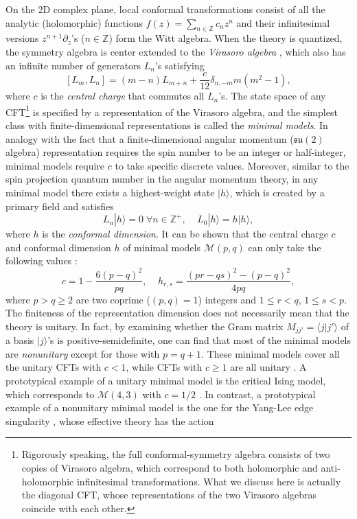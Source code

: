 \documentclass{tADP2e}
\theoremstyle{plain}
\theoremstyle{plain}
\theoremstyle{definition}
\begin{document}
\vspace{3pt}
\noindent
On the 2D complex plane, local conformal transformations consist of all the analytic (holomorphic) functions $f(z)=\sum_{n\in\mathbb{Z}}c_nz^n$ and their infinitesimal versions $z^{n+1}\partial_z$'s ($n\in\mathbb{Z}$) form the Witt algebra. When the theory is quantized, the symmetry algebra is center extended to the \emph{Virasoro algebra} \cite{VMA70}, which also has an infinite number of generators $L_n$'s satisfying
\begin{equation}\label{virasoroa}
[L_m,L_n]=(m-n)L_{m+n}+\frac{c}{12}\delta_{n,-m}m(m^2-1),
\end{equation}
where $c$ is the \emph{central charge} that commutes all $L_n$'s. The state space of any CFT\footnote{Rigorously speaking, the full conformal-symmetry algebra consists of two copies of Virasoro algebra, which correspond to both holomorphic and anti-holomorphic infinitesimal transformations. What we discuss here is actually the {diagonal CFT, whose representations of the two Virasoro algebras coincide with each other}.} is specified by a representation of the Virasoro algebra, and the simplest class with finite-dimensional representations is called the \emph{minimal models}. In analogy with the fact that a finite-dimensional angular momentum ($\mathfrak{su}(2)$ algebra)  representation requires the spin number to be an integer or half-integer, minimal models require $c$ to take specific discrete values. Moreover, similar to the spin projection quantum number in the angular momentum theory, in any minimal model there exists a highest-weight state $|h\rangle$, which is created by a primary field and satisfies
\begin{equation}
L_n|h\rangle=0\;\forall n\in\mathbb{Z}^+,\;\;\;\;L_0|h\rangle=h|h\rangle,
\end{equation}
where $h$ is the \emph{conformal dimension}. It can be shown that the central charge $c$ and conformal dimension $h$ of minimal models $\mathcal{M}(p,q)$ can only take the following values \cite{FD84,AAB84}:
\begin{equation}
c=1-\frac{6(p-q)^2}{pq},\;\;\;\;
h_{r,s}=\frac{(pr-qs)^2-(p-q)^2}{4pq},
\label{ch}
\end{equation}
where $p>q\ge2$ are two coprime ($(p,q)=1$) integers and $1\le r<q$, $1\le s<p$. The finiteness of the representation dimension does not necessarily mean that the theory is unitary. In fact, by examining whether the Gram matrix $M_{jj'}=\langle j|j'\rangle$ of a basis $|j\rangle$'s is positive-semidefinite, one can find that most of the minimal models are \emph{nonunitary} except for those with $p=q+1$. These minimal models cover all the unitary CFTs with $c<1$, while CFTs with $c\ge1$ are all unitary \cite{FD84}. A prototypical example of a unitary minimal model is the critical Ising model, which corresponds to $\mathcal{M}(4,3)$ with $c=1/2$ \cite{FD84}. In contrast, a prototypical example of a nonunitary minimal model is the one for the Yang-Lee edge singularity \cite{MEF78}, whose effective theory has the action
\end{document}
